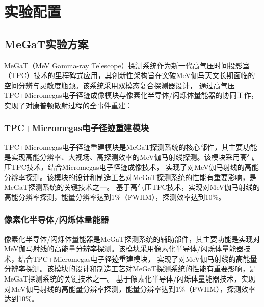 \chapter{实验配置}
\label{chap:inverseproblem}
\section{MeGaT实验方案}
MeGaT（MeV Gamma-ray Telescope）探测系统作为新一代高气压时间投影室（TPC）技术的里程碑式应用，其创新性架构旨在突破MeV伽马天文长期面临的空间分辨与灵敏度瓶颈。该系统采用双模态复合探测器设计，
通过高气压TPC+Micromegas电子径迹成像模块与像素化半导体/闪烁体量能器的协同工作，实现了对康普顿散射过程的全事件重建：
\subsection{TPC+Micromegas电子径迹重建模块}
	TPC+Micromegas电子径迹重建模块是MeGaT探测系统的核心部件，其主要功能是实现高能分辨率、大视场、高探测效率的MeV伽马射线探测。该模块采用高气压TPC技术，结合Micromegas电子径迹成像技术，
	实现了对MeV伽马射线的高能分辨率探测。该模块的设计和制造工艺对MeGaT探测系统的性能有重要影响，是MeGaT探测系统的关键技术之一。
	基于高气压TPC技术，实现对MeV伽马射线的高能分辨率探测，能量分辨率达到1\%（FWHM），探测效率达到10\%。\par
\subsection{像素化半导体/闪烁体量能器}
	像素化半导体/闪烁体量能器是MeGaT探测系统的辅助部件，其主要功能是实现对MeV伽马射线的高能量分辨率探测。该模块采用像素化半导体/闪烁体量能器技术，结合TPC+Micromegas电子径迹重建模块，
	实现了对MeV伽马射线的高能量分辨率探测。该模块的设计和制造工艺对MeGaT探测系统的性能有重要影响，是MeGaT探测系统的关键技术之一。
	基于像素化半导体/闪烁体量能器技术，实现对MeV伽马射线的高能量分辨率探测，能量分辨率达到1\%（FWHM），探测效率达到10\%。\par

